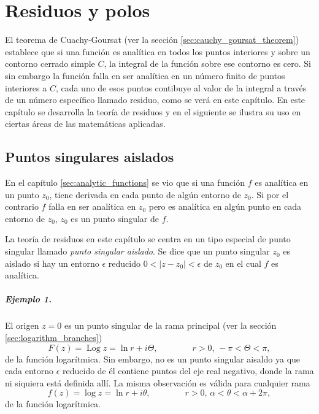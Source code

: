 \documentclass[a4paper]{report}
\DeclareMathOperator{\Log}{Log}
\begin{document}
\chapter{Residuos y polos}

El teorema de Cuachy-Goursat (ver la sección \ref{sec:cauchy_goursat_theorem}) establece que si una función es analítica en todos los puntos interiores y sobre un contorno cerrado simple \(C\), la integral de la función sobre ese contorno es cero. Si sin embargo la función falla en ser analítica en un número finito de puntos interiores a \(C\), cada uno de esos puntos contibuye al valor de la integral a través de un número específico llamado residuo, como se verá en este capítulo. En este capítulo se desarrolla la teoría de residuos y en el siguiente se ilustra su uso en ciertas áreas de las matemáticas aplicadas.

\section{Puntos singulares aislados}\label{sec:isolated_singular_points}

En el capítulo \ref{sec:analytic_functions} se vio que si una función \(f\) es analítica en un punto \(z_0\), tiene derivada en cada punto de algún entorno de \(z_0\). Si por el contrario \(f\) falla en ser analítica en \(z_0\) pero es analítica en algún punto en cada entorno de \(z_0\), \(z_0\) es un punto singular de \(f\).

La teoría de residuos en este capítulo se centra en un tipo especial de punto singular llamado \emph{punto singular aislado}. Se dice que un punto singular \(z_0\) es aislado si hay un entorno \(\epsilon\) reducido \(0<|z-z_0|<\epsilon\) de \(z_0\) en el cual \(f\) es analítica.  

\paragraph{Ejemplo 1.} El origen \(z=0\) es un punto singular de la rama principal (ver la sección \ref{sec:logarithm_branches})
\[
 F(z)=\Log z=\ln r+i\Theta,
 \qquad\qquad
 r>0,\,-\pi<\Theta<\pi, 
\]
de la función logarítmica. Sin embargo, no es un punto singular aisaldo ya que cada entorno \(\epsilon\) reducido de él contiene puntos del eje real negativo, donde la rama ni siquiera está definida allí. La misma observación es válida para cualquier rama
\[
 f(z)=\log z=\ln r+i\theta,
 \qquad\qquad
 r>0,\,\alpha<\theta<\alpha+2\pi, 
\]
de la función logarítmica.
\end{document}
